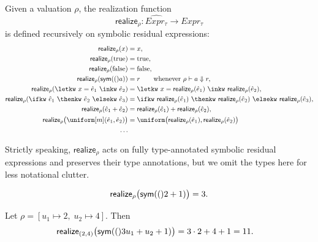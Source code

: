 \begin{definition}[Realization]
Given a
valuation $\rho$, the realization function
\[
  \mathsf{realize}_\rho :
  \widehat{Expr_\tau}\to Expr_\tau
\]
is defined recursively on symbolic residual expressions:
  \begin{align*}
    \mathsf{realize}_\rho(x)
    &=
    x,\\
    \mathsf{realize}_\rho(\text{true})
    &=
    \text{true},\\
    \mathsf{realize}_\rho(\text{false})
    &=
    \text{false},\\
    \mathsf{realize}_\rho(\sym(a))
    &=
    r
    \qquad
    \text{whenever } \rho \vdash a \Downarrow r,\\
    \mathsf{realize}_\rho(\letkw\ x=\hat e_1\ \inkw\ \hat e_2)
    &=
    \letkw\ x=\mathsf{realize}_\rho(\hat e_1)
    \ \inkw\ \mathsf{realize}_\rho(\hat e_2),\\
    \mathsf{realize}_\rho(
      \ifkw\ \hat e_1\ \thenkw\ \hat e_2\ \elsekw\ \hat e_3)
    &=
    \ifkw\ \mathsf{realize}_\rho(\hat e_1)
    \ \thenkw\ \mathsf{realize}_\rho(\hat e_2)
    \ \elsekw\ \mathsf{realize}_\rho(\hat e_3),\\
    \mathsf{realize}_\rho(\hat e_1 + \hat e_2)
    &=
    \mathsf{realize}_\rho(\hat e_1)
    +
    \mathsf{realize}_\rho(\hat e_2),\\
    \mathsf{realize}_\rho
      \bigl(\uniform[m](\hat e_1,\hat e_2)\bigr)
    &=
    \uniform\bigl(
      \mathsf{realize}_\rho(\hat e_1),
      \mathsf{realize}_\rho(\hat e_2)
    \bigr) \\
    \ldots
  \end{align*}
\end{definition}

Strictly speaking, $\mathsf{realize}_{\rho}$ acts on fully type-annotated symbolic residual expressions and preserves their type annotations, but we omit the types here for less notational clutter.

\begin{example}
  \[
    \mathsf{realize}_{\rho}\bigl(\mathsf{sym}(()2+1)\bigr)
    =
    3.
  \]
\end{example}

\begin{example}
  Let $\rho=[u_1\mapsto 2,\;u_2\mapsto 4]$. Then
  \[
    \begin{aligned}
      \mathsf{realize}_{(2,4)}
      \bigl(\mathsf{sym}(()3u_1+u_2+1)\bigr)
      &=
      3 \cdot 2 + 4 + 1 = 11.
    \end{aligned}
  \]
\end{example}


